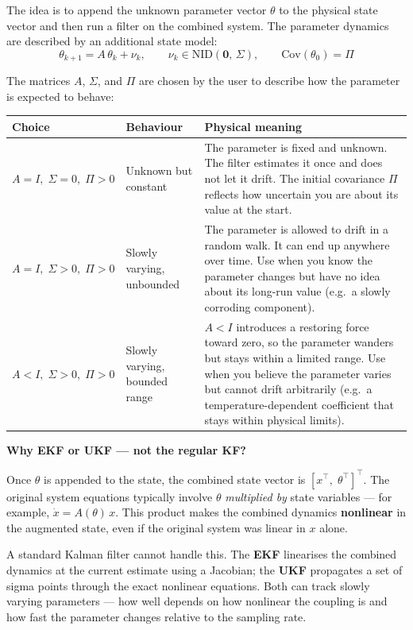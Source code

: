 \documentclass[12pt, a4paper]{article}
\begin{document}
The idea is to append the unknown parameter vector $\theta$ to the
physical state vector and then run a filter on the combined system.
The parameter dynamics are described by an additional state model:
\[
  \theta_{k+1} = A\,\theta_k + \nu_k,
  \qquad \nu_k \in \mathrm{NID}(\mathbf{0},\,\Sigma),
  \qquad \mathrm{Cov}(\theta_0) = \Pi
\]

The matrices $A$, $\Sigma$, and $\Pi$ are chosen by the user to describe
how the parameter is expected to behave:

\begin{center}
\begin{tabular}{@{} l p{3.5cm} p{7.0cm} @{}}
  \toprule
  Choice & Behaviour & Physical meaning \\
  \midrule
  $A = I,\;\Sigma = 0,\;\Pi > 0$ & Unknown but constant &
    The parameter is fixed and unknown.
    The filter estimates it once and does not let it drift.
    The initial covariance $\Pi$ reflects how uncertain you are about
    its value at the start. \\[4pt]
  $A = I,\;\Sigma > 0,\;\Pi > 0$ & Slowly varying, unbounded &
    The parameter is allowed to drift in a random walk.
    It can end up anywhere over time.
    Use when you know the parameter changes but have no idea about its
    long-run value (e.g.\ a slowly corroding component). \\[4pt]
  $A < I,\;\Sigma > 0,\;\Pi > 0$ & Slowly varying, bounded range &
    $A < I$ introduces a restoring force toward zero, so the parameter
    wanders but stays within a limited range.
    Use when you believe the parameter varies but cannot drift
    arbitrarily (e.g.\ a temperature-dependent coefficient that stays
    within physical limits). \\
  \bottomrule
\end{tabular}
\end{center}

\begin{notebox}
  \textbf{Why EKF or UKF --- not the regular KF?}

  Once $\theta$ is appended to the state, the combined state vector is
  $[x^\top,\;\theta^\top]^\top$.
  The original system equations typically involve $\theta$
  \emph{multiplied by} state variables --- for example,
  $\dot{x} = A(\theta)\,x$.
  This product makes the combined dynamics \textbf{nonlinear} in the
  augmented state, even if the original system was linear in $x$ alone.

  A standard Kalman filter cannot handle this.
  The \textbf{EKF} linearises the combined dynamics at the current
  estimate using a Jacobian; the \textbf{UKF} propagates a set of
  sigma points through the exact nonlinear equations.
  Both can track slowly varying parameters --- how well depends on
  how nonlinear the coupling is and how fast the parameter changes
  relative to the sampling rate.
\end{notebox}
\end{document}
